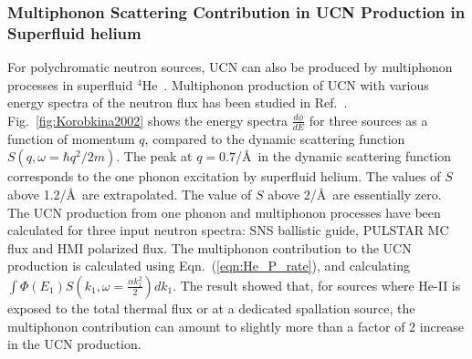 

 \subsubsection{Multiphonon Scattering Contribution in UCN Production
   in Superfluid helium}
 For polychromatic neutron sources, UCN can also be produced by
 multiphonon processes in superfluid
 $^4$He~\cite{Korobkina2002,Schmidt2009}. Multiphonon production of
 UCN with various energy spectra of the neutron flux has been studied
 in Ref.~\cite{Korobkina2002}.  Fig.~\ref{fig:Korobkina2002} shows the
 energy spectra $\frac{d\phi}{dE}$ for three sources as a function of
 momentum $q$, compared to the dynamic scattering function
 $S(q,\omega=\hbar q^2/2m)$. The peak at $q=0.7$/\AA~in the dynamic
 scattering function corresponds to the one phonon excitation by
 superfluid helium. The values of $S$ above 1.2/\AA~are
 extrapolated. The value of $S$ above 2/\AA~are essentially zero.  The
 UCN production from one phonon and multiphonon processes have been
 calculated for three input neutron spectra: SNS ballistic guide,
 PULSTAR MC flux and HMI polarized flux.  The multiphonon contribution
 to the UCN production is calculated using Eqn.~(\ref{eqn:He_P_rate}),
 and calculating
 $\int \Phi(E_1)S(k_1,\omega=\frac{\alpha k_1^2}{2}) dk_1$.  The
 result showed that, for sources where He-II is exposed to the total
 thermal flux or at a dedicated spallation source, the multiphonon
 contribution can amount to slightly more than a factor of 2 increase
 in the UCN production.






